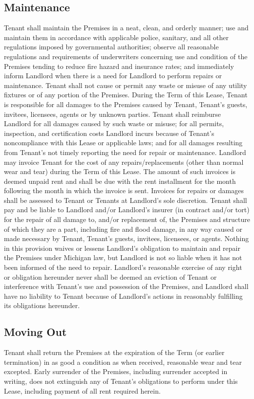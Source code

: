 \documentclass{article}
\begin{document}
\subsection{Maintenance}
Tenant shall maintain the Premises in a neat, clean, and orderly manner; use and
maintain them in accordance with applicable police, sanitary, and all other
regulations imposed by governmental authorities; observe all reasonable
regulations and requirements of underwriters concerning use and condition of the
Premises tending to reduce fire hazard and insurance rates; and immediately
inform Landlord when there is a need for Landlord to perform repairs or
maintenance. Tenant shall not cause or permit any waste or misuse of any utility
fixtures or of any portion of the Premises. During the Term of this Lease,
Tenant is responsible for all damages to the Premises caused by Tenant, Tenant’s
guests, invitees, licensees, agents or by unknown parties. Tenant shall
reimburse Landlord for all damages caused by such waste or misuse; for all
permits, inspection, and certification costs Landlord incurs because of Tenant’s
noncompliance with this Lease or applicable laws; and for all damages resulting
from Tenant’s not timely reporting the need for repair or maintenance. Landlord
may invoice Tenant for the cost of any repairs\slash replacements (other than
normal wear and tear) during the Term of this Lease. The amount of such invoices
is deemed unpaid rent and shall be due with the rent installment for the month
following the month in which the invoice is sent. Invoices for repairs or
damages shall be assessed to Tenant or Tenants at Landlord’s sole discretion.
Tenant
shall pay and be liable to Landlord and/or Landlord’s insurer (in contract
and/or tort) for the repair of all damage to, and/or replacement of, the
Premises and structure of which they are a part, including fire and flood
damage, in any way caused or made necessary by Tenant, Tenant’s guests,
invitees, licensees, or agents. Nothing in this provision waives or lessens
Landlord’s obligation to maintain and repair the Premises under Michigan law,
but Landlord is not so liable when it has not been informed of the need to
repair. Landlord’s reasonable exercise of any right or obligation hereunder
never shall be deemed an eviction of Tenant or interference with Tenant’s use
and possession of the Premises, and Landlord shall have no liability to Tenant
because of Landlord’s actions in reasonably fulfilling its obligations
hereunder.

\subsection{Moving Out}
Tenant shall return the Premises at the expiration of the Term (or earlier
termination) in as good a condition as when received, reasonable wear and tear
excepted. Early surrender of the Premises, including surrender accepted in
writing, does not extinguish any of Tenant’s obligations to perform under this
Lease, including payment of all rent required herein.
\end{document}
